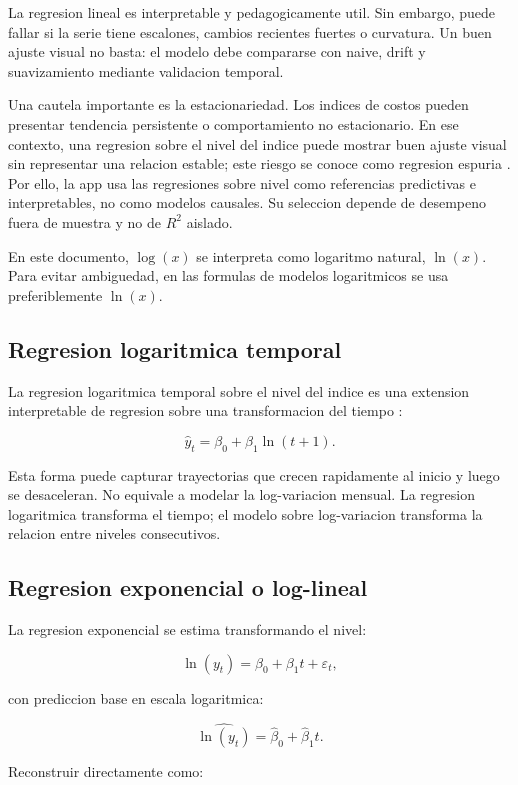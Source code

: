 ﻿\documentclass[12pt,letterpaper]{article}
\newcommand{\yhat}{\hat{y}}
\begin{document}
La regresion lineal es interpretable y pedagogicamente util. Sin embargo, puede fallar si la serie tiene escalones, cambios recientes fuertes o curvatura. Un buen ajuste visual no basta: el modelo debe compararse con naive, drift y suavizamiento mediante validacion temporal.

Una cautela importante es la estacionariedad. Los indices de costos pueden presentar tendencia persistente o comportamiento no estacionario. En ese contexto, una regresion sobre el nivel del indice puede mostrar buen ajuste visual sin representar una relacion estable; este riesgo se conoce como regresion espuria \citep{springer_spurious_regressions}. Por ello, la app usa las regresiones sobre nivel como referencias predictivas e interpretables, no como modelos causales. Su seleccion depende de desempeno fuera de muestra y no de \(R^2\) aislado.

En este documento, \(\log(x)\) se interpreta como logaritmo natural, \(\ln(x)\). Para evitar ambiguedad, en las formulas de modelos logaritmicos se usa preferiblemente \(\ln(x)\).

\subsection{Regresion logaritmica temporal}

La regresion logaritmica temporal sobre el nivel del indice es una extension interpretable de regresion sobre una transformacion del tiempo \citep{penn_state_stat501}:

\[
\yhat_t=\beta_0+\beta_1\ln(t+1).
\]

Esta forma puede capturar trayectorias que crecen rapidamente al inicio y luego se desaceleran. No equivale a modelar la log-variacion mensual. La regresion logaritmica transforma el tiempo; el modelo sobre log-variacion transforma la relacion entre niveles consecutivos.

\subsection{Regresion exponencial o log-lineal}

La regresion exponencial se estima transformando el nivel:

\[
\ln(y_t)=\beta_0+\beta_1 t+\varepsilon_t,
\]

con prediccion base en escala logaritmica:

\[
\widehat{\ln(y_t)}=\hat{\beta}_0+\hat{\beta}_1t.
\]

Reconstruir directamente como:
\end{document}
